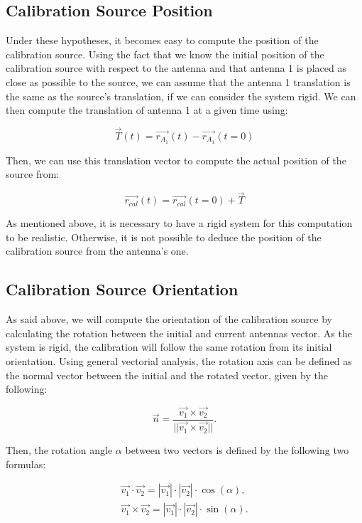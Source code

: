 \documentclass[../../thesis.tex]{subfiles}
\begin{document}
\subsection{Calibration Source Position}
Under these hypotheses, it becomes easy to compute the position of the calibration source. Using the fact that we know the initial position of the calibration source with respect to the antenna and that antenna 1 is placed as close as possible to the source, we can assume that the antenna 1 translation is the same as the source's translation, if we can consider the system rigid. We can then compute the translation of antenna 1 at a given time using:

\begin{equation}
    \vec{T}(t) = \vec{r_{A_1}}(t) - \vec{r_{A_1}}(t = 0)
\end{equation}

Then, we can use this translation vector to compute the actual position of the source from:

\begin{equation}
    \vec{r_{cal}}(t) = \vec{r_{cal}}(t=0) + \vec{T}
\end{equation}

As mentioned above, it is necessary to have a rigid system for this computation to be realistic. Otherwise, it is not possible to deduce the position of the calibration source from the antenna's one.

\subsection{Calibration Source Orientation}
As said above, we will compute the orientation of the calibration source by calculating the rotation between the initial and current antennas vector. As the system is rigid, the calibration will follow the same rotation from its initial orientation. Using general vectorial analysis, the rotation axis can be defined as the normal vector between the initial and the rotated vector, given by the following:

\begin{equation}
    \vec{n} = \frac{\vec{v_1} \times \vec{v_2}}{||\vec{v_1} \times \vec{v_2}||}.
\end{equation}

Then, the rotation angle $\alpha$ between two vectors is defined by the following two formulas:

\begin{equation}
    \begin{split}
        \vec{v_1} \cdot \vec{v_2} = |\vec{v_1}| \cdot |\vec{v_2}| \cdot \cos(\alpha),  \\
        \vec{v_1} \times \vec{v_2} = |\vec{v_1}| \cdot |\vec{v_2}| \cdot \sin(\alpha). \\
    \end{split}
\end{equation}
\end{document}
